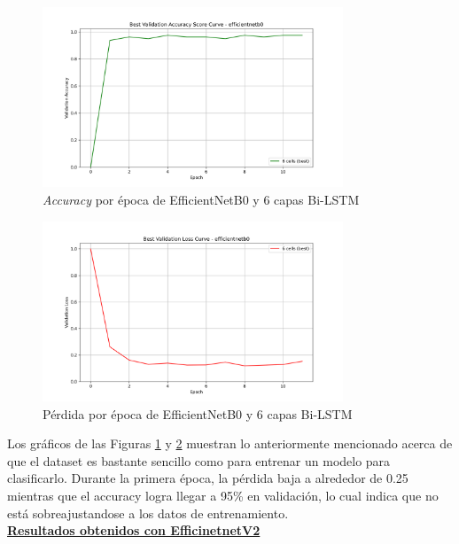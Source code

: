 \begin{figure}[h!] 
    \includegraphics[width=0.8\textwidth]{../graphs/efficientnetb0_best_val_accuracy.png} 
    \centering 
    \caption{\textit{Accuracy} por época de EfficientNetB0 y 6 capas Bi-LSTM } 
    \label{EfficientNetB0Accuracy} 
\end{figure}

\begin{figure}[h!] 
    \includegraphics[width=0.8\textwidth]{../graphs/efficientnetb0_best_val_loss.png}
    \centering 
    \caption{Pérdida por época de EfficientNetB0 y 6 capas Bi-LSTM } 
    \label{EfficientNetB0Loss} 
\end{figure}


Los gráficos de las Figuras \ref{EfficientNetB0Accuracy} y 
\ref{EfficientNetB0Loss} muestran lo anteriormente mencionado acerca de 
que el dataset es bastante sencillo como para entrenar un modelo 
para clasificarlo. Durante la primera época, la pérdida baja a alrededor 
de 0.25 mientras que el accuracy logra llegar a 95\% en validación, 
lo cual indica que no está sobreajustandose a los datos de entrenamiento.\\ 

\textbf{\underline{Resultados obtenidos con EfficinetnetV2}}\\

